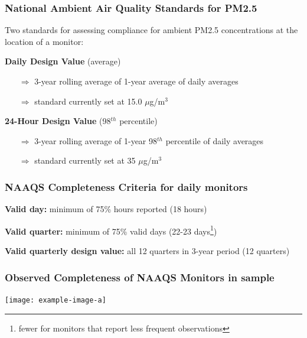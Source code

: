 \documentclass{beamer}
\begin{document}


\begin{frame}
\frametitle{National Ambient Air Quality Standards for PM2.5}
Two standards for assessing compliance for ambient PM2.5 concentrations at the location of a monitor:
\vspace{2em}

\textbf{Daily Design Value} (average)
\begin{itemize}
    \item[$\Rightarrow$] 3-year rolling average of 1-year average of daily averages
    \item[$\Rightarrow$] standard currently set at 15.0 $\mu$g/m$^3$
\end{itemize}
\vspace{1em}

\textbf{24-Hour Design Value} (98$^{th}$ percentile)
\begin{itemize}
    \item[$\Rightarrow$] 3-year rolling average of 1-year 98$^{th}$ percentile of daily averages
    \item[$\Rightarrow$] standard currently set at 35 $\mu$g/m$^3$
\end{itemize}
\end{frame}


\begin{frame}
\frametitle{NAAQS Completeness Criteria for daily monitors}

\textbf{Valid day:}
minimum of 75\% hours reported  (18 hours)

\vspace{2em}
\textbf{Valid quarter:}
minimum of 75\% valid days  (22-23 days\footnote{fewer for monitors that report less frequent observations})

\vspace{2em}
\textbf{Valid quarterly design value:}
all 12 quarters in 3-year period (12 quarters)

\end{frame}


\begin{frame}
\frametitle{Observed Completeness of NAAQS Monitors in sample}
\texttt{[image: example-image-a]}
\end{frame}
\end{document}
